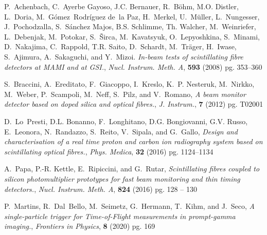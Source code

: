 \documentclass[a4paper,11pt]{article}
\begin{document}
\begin{thebibliography}{99}
P.~Achenbach, C.~Ayerbe Gayoso, J.C. Bernauer, R.~Böhm, M.O. Distler,
  L.~Doria, M.~Gómez~Rodríguez de~la Paz, H.~Merkel, U.~Müller,
  L.~Nungesser, J.~Pochodzalla, S.~Sánchez Majos, B.S. Schlimme, Th. Walcher,
  M.~Weinriefer, L.~Debenjak, M.~Potokar, S.~Širca, M.~Kavatsyuk,
  O.~Lepyoshkina, S.~Minami, D.~Nakajima, C.~Rappold, T.R. Saito, D.~Schardt,
  M.~Träger, H.~Iwase, S.~Ajimura, A.~Sakaguchi, and Y.~Mizoi. \emph{In-beam tests of scintillating fibre detectors at {MAMI} and at {GSI}.}, \emph{Nucl. Instrum. Meth. A}, \textbf{593} (2008) pg.
  353--360

S.~Braccini, A.~Ereditato, F.~Giacoppo, I.~Kreslo, K.~P. Nesteruk, M.~Nirkko,
  M.~Weber, P.~Scampoli, M.~Neff, S.~Pilz, and V.~Romano, \emph{A beam monitor detector based on doped silica and optical fibres.}, \emph{J. Instrum.}, \textbf{7} (2012) pg. T02001

D.~Lo~Presti, D.L. Bonanno, F.~Longhitano, D.G. Bongiovanni, G.V. Russo,
  E.~Leonora, N.~Randazzo, S.~Reito, V.~Sipala, and G.~Gallo, \emph{Design and characterisation of a real time proton and carbon ion
  radiography system based on scintillating optical fibres.}, \emph{Phys. Medica}, \textbf{32} (2016) pg. 1124--1134

A.~Papa, P.-R. Kettle, E.~Ripiccini, and G.~Rutar, \emph{Scintillating fibres coupled to silicon photomultiplier prototypes for fast beam monitoring and thin timing detectors.}, \emph{Nucl. Instrum. Meth. A}, \textbf{824} (2016) pg. 128 -- 130

P.~Martins, R.~Dal~Bello, M.~Seimetz, G.~Hermann, T.~Kihm, and J.~Seco, \emph{A single-particle trigger for {T}ime-of-{F}light measurements in
  prompt-gamma imaging.}, \emph{Frontiers in Physics}, \textbf{8} (2020) pg. 169


\end{thebibliography}
\end{document}
